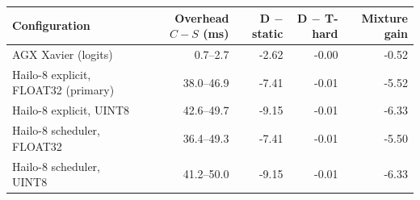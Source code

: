 \begin{tabular}{@{}lrrrr@{}}
\toprule
Configuration & Overhead $C-S$ (ms) & D $-$ static & D $-$ T-hard & Mixture gain \\
\midrule
AGX Xavier (logits) & 0.7--2.7 & -2.62 & -0.00 & -0.52 \\
Hailo-8 explicit, FLOAT32 (primary) & 38.0--46.9 & -7.41 & -0.01 & -5.52 \\
Hailo-8 explicit, UINT8 & 42.6--49.7 & -9.15 & -0.01 & -6.33 \\
Hailo-8 scheduler, FLOAT32 & 36.4--49.3 & -7.41 & -0.01 & -5.50 \\
Hailo-8 scheduler, UINT8 & 41.2--50.0 & -9.15 & -0.01 & -6.33 \\
\bottomrule
\end{tabular}
